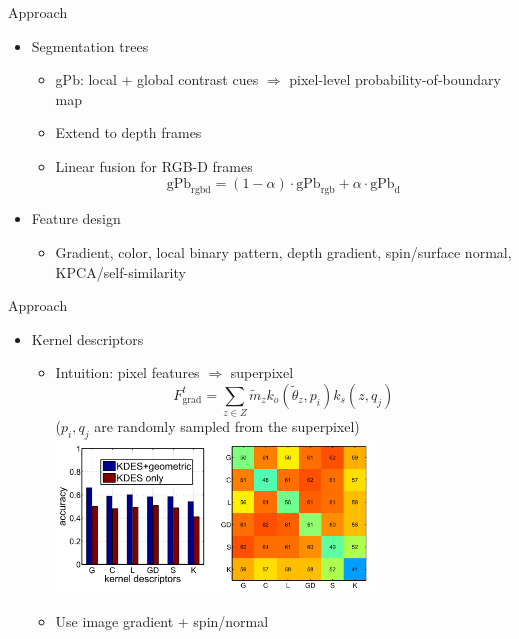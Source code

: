 \documentclass[12pt]{beamer}
\begin{document}
\begin{frame}{Approach}
	\begin{itemize}
		\item Segmentation trees
		\begin{itemize}
			\item gPb: local + global contrast cues $\Rightarrow$ pixel-level probability-of-boundary map
			\item Extend to depth frames
			\item Linear fusion for RGB-D frames \\
            \[\text{gPb}_\text{rgbd} = (1 - \alpha) \cdot \text{gPb}_\text{rgb} + \alpha \cdot \text{gPb}_\text{d}\]
		\end{itemize}
		\item Feature design
		\begin{itemize}
			\item Gradient, color, local binary pattern, depth gradient, spin/surface normal, KPCA/self-similarity
		\end{itemize}
	\end{itemize}
\end{frame}

\begin{frame}{Approach}
	\begin{itemize}
		\item Kernel descriptors
		\begin{itemize}
			\item Intuition: pixel features $\Rightarrow$ superpixel
			\[F_\text{grad}^t = \sum_{z\in Z}\tilde{m}_zk_o(\tilde{\theta}_z, p_i)k_s(z, q_j)\]
            ($p_i, q_j$ are randomly sampled from the superpixel)
			\includegraphics[width=0.7\textwidth]{fig3.png} \\
			\item Use image gradient + spin/normal
		\end{itemize}
	\end{itemize}
\end{frame}
\end{document}
